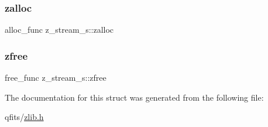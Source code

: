 \subsubsection{\texorpdfstring{zalloc}{zalloc}}
{\footnotesize\ttfamily alloc\+\_\+func z\+\_\+stream\+\_\+s\+::zalloc}

\mbox{\label{structz__stream__s_a89eb750ade7f4f0b56bfdadf13344982}} 
\subsubsection{\texorpdfstring{zfree}{zfree}}
{\footnotesize\ttfamily free\+\_\+func z\+\_\+stream\+\_\+s\+::zfree}



The documentation for this struct was generated from the following file\+:\begin{DoxyCompactItemize}
\item 
qfits/\hyperlink{zlib_8h}{zlib.\+h}\end{DoxyCompactItemize}

